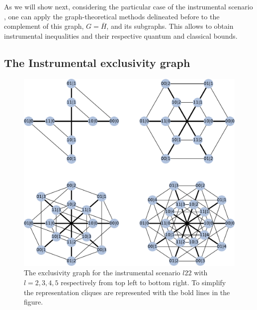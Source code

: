 \documentclass[letterpaper]{article}
\begin{document}
As we will show next, considering the particular case of the instrumental
scenario \cite{}, one can apply the graph-theoretical methods delineated before
to the complement of this graph, $G=\bar{H}$, and its subgraphs. This allows to
obtain instrumental inequalities and their respective quantum and
classical bounds.

\subsection{The Instrumental exclusivity graph}
\begin{figure}[t]
    \centering
    \includegraphics[width=\columnwidth]{images/instrumental_exgraph.pdf}
    \caption{
    The exclusivity graph for the instrumental scenario $l22$ with $l=2,3,4,5$
    respectively from top left to bottom right. 
    To simplify the representation cliques are represented with the bold lines
    in the figure.}
    \label{fig:instrumental_exgraphs}
\end{figure}

\end{document}
